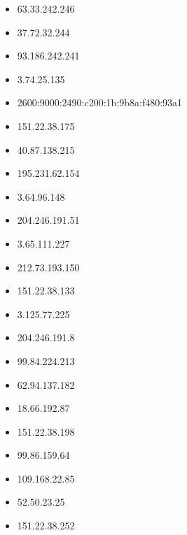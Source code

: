\documentclass{article}
\begin{document}
\begin{itemize}
        \item 63.33.242.246
    
        \item 37.72.32.244
    
        \item 93.186.242.241
    
        \item 3.74.25.135
    
        \item 2600:9000:2490:c200:1b:9b8a:f480:93a1
    
        \item 151.22.38.175
    
        \item 40.87.138.215
    
        \item 195.231.62.154
    
        \item 3.64.96.148
    
        \item 204.246.191.51
    
        \item 3.65.111.227
    
        \item 212.73.193.150
    
        \item 151.22.38.133
    
        \item 3.125.77.225
    
        \item 204.246.191.8
    
        \item 99.84.224.213
    
        \item 62.94.137.182
    
        \item 18.66.192.87
    
        \item 151.22.38.198
    
        \item 99.86.159.64
    
        \item 109.168.22.85
    
        \item 52.50.23.25
    
        \item 151.22.38.252
    

\end{itemize}
\end{document}
